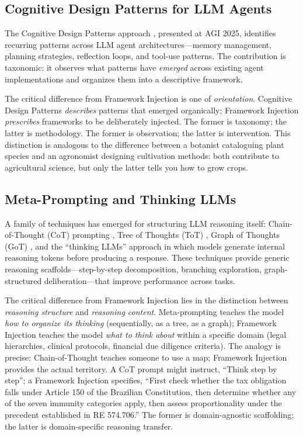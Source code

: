 \documentclass[12pt,a4paper]{article}
\begin{document}
\subsection{Cognitive Design Patterns for LLM Agents}
\label{sec:related:cdp}

The Cognitive Design Patterns approach \citep{agi2025cognitive}, presented at AGI 2025, identifies recurring patterns across LLM agent architectures---memory management, planning strategies, reflection loops, and tool-use patterns. The contribution is taxonomic: it observes what patterns have \emph{emerged} across existing agent implementations and organizes them into a descriptive framework.

The critical difference from Framework Injection is one of \emph{orientation}. Cognitive Design Patterns \emph{describes} patterns that emerged organically; Framework Injection \emph{prescribes} frameworks to be deliberately injected. The former is taxonomy; the latter is methodology. The former is observation; the latter is intervention. This distinction is analogous to the difference between a botanist cataloguing plant species and an agronomist designing cultivation methods: both contribute to agricultural science, but only the latter tells you how to grow crops.

\subsection{Meta-Prompting and Thinking LLMs}
\label{sec:related:meta}

A family of techniques has emerged for structuring LLM reasoning itself: Chain-of-Thought (CoT) prompting \citep{wei2022chain}, Tree of Thoughts (ToT) \citep{yao2023tree}, Graph of Thoughts (GoT) \citep{besta2024graph}, and the ``thinking LLMs'' approach in which models generate internal reasoning tokens before producing a response. These techniques provide generic reasoning scaffolds---step-by-step decomposition, branching exploration, graph-structured deliberation---that improve performance across tasks.

The critical difference from Framework Injection lies in the distinction between \emph{reasoning structure} and \emph{reasoning content}. Meta-prompting teaches the model \emph{how to organize its thinking} (sequentially, as a tree, as a graph); Framework Injection teaches the model \emph{what to think about} within a specific domain (legal hierarchies, clinical protocols, financial due diligence criteria). The analogy is precise: Chain-of-Thought teaches someone to use a map; Framework Injection provides the actual territory. A CoT prompt might instruct, ``Think step by step''; a Framework Injection specifies, ``First check whether the tax obligation falls under Article 150 of the Brazilian Constitution, then determine whether any of the seven immunity categories apply, then assess proportionality under the precedent established in RE 574.706.'' The former is domain-agnostic scaffolding; the latter is domain-specific reasoning transfer.
\end{document}

